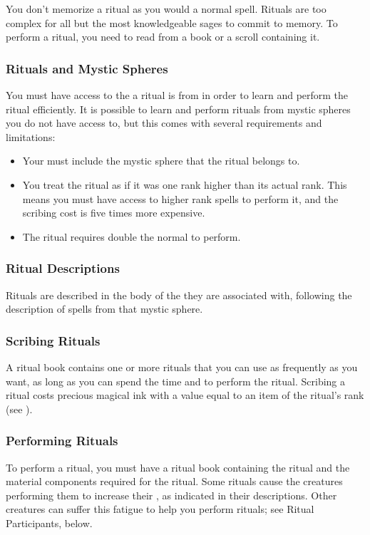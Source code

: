         You don't memorize a ritual as you would a normal spell.
        Rituals are too complex for all but the most knowledgeable sages to commit to memory.
        To perform a ritual, you need to read from a book or a scroll containing it.

        \subsubsection{Rituals and Mystic Spheres}
            You must have access to the  a ritual is from in order to learn and perform the ritual efficiently.
            It is possible to learn and perform rituals from mystic spheres you do not have access to, but this comes with several requirements and limitations:
            \begin{itemize}
                \item Your  must include the mystic sphere that the ritual belongs to.
                \item You treat the ritual as if it was one rank higher than its actual rank.
                    This means you must have access to higher rank spells to perform it, and the scribing cost is five times more expensive.
                \item The ritual requires double the normal  to perform.
            \end{itemize}

        \subsubsection{Ritual Descriptions}
            Rituals are described in the body of the  they are associated with, following the description of spells from that mystic sphere.

        \subsubsection{Scribing Rituals}
            A ritual book contains one or more rituals that you can use as frequently as you want, as long as you can spend the time and  to perform the ritual.
            Scribing a ritual costs precious magical ink with a value equal to an item of the ritual's rank (see ).

        \subsubsection{Performing Rituals}
            To perform a ritual, you must have a ritual book containing the ritual and the material components required for the ritual.
            Some rituals cause the creatures performing them to increase their , as indicated in their descriptions.
            Other creatures can suffer this fatigue to help you perform rituals; see Ritual Participants, below.

